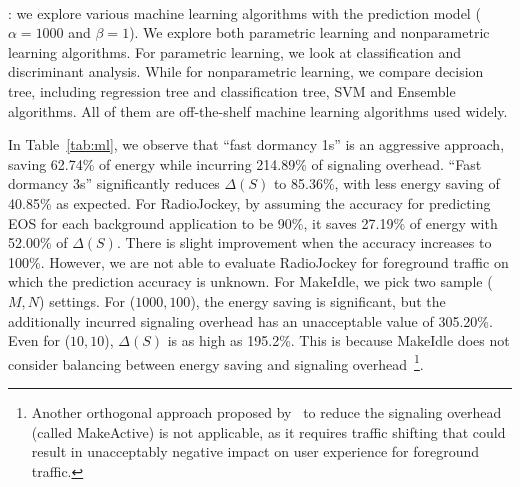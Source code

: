 \paragraph{\NAMEFULL}: we explore various machine learning algorithms with the \MostRecent prediction model ($\alpha=1000$ and $\beta=1$).
We explore both parametric learning and nonparametric learning algorithms. For parametric learning, we look at \NB classification and discriminant analysis. While for nonparametric learning, we compare decision tree, including regression tree and classification tree, SVM and Ensemble algorithms. All of them are off-the-shelf machine learning algorithms used widely.

In Table~\ref{tab:ml}, we observe that ``fast dormancy 1s'' is an aggressive approach, saving 62.74\% of energy while incurring 214.89\% of signaling overhead. ``Fast dormancy 3s'' significantly reduces $\Delta(S)$ to 85.36\%, with less energy saving of 40.85\% as expected. For RadioJockey, by assuming the accuracy for predicting EOS for each background application to be 90\%, it saves 27.19\% of energy with 52.00\% of $\Delta(S)$.
There is slight improvement when the accuracy increases to 100\%. However, we are not able to evaluate RadioJockey for foreground traffic on which the prediction accuracy is unknown. For MakeIdle, we pick two sample ($M, N$) settings. For ($1000, 100$), the energy saving is significant, but the additionally incurred signaling overhead has an unacceptable value of 305.20\%. Even for ($10, 10$), $\Delta(S)$ is as high as 195.2\%. This is because MakeIdle does not consider balancing between energy saving and signaling overhead~\footnote{Another orthogonal approach proposed by~\cite{makeidle} to reduce the signaling overhead (called MakeActive) is not applicable, as it requires traffic shifting that could result in unacceptably negative impact on user experience for foreground traffic.}.

